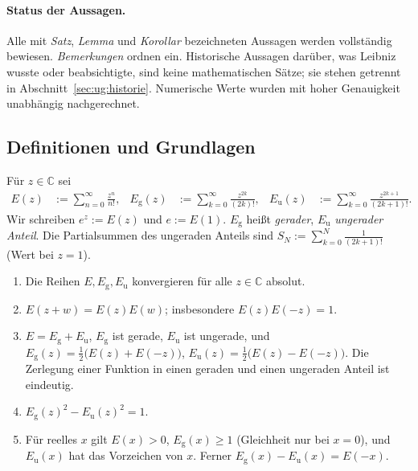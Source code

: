 \paragraph{Status der Aussagen.}
Alle mit \emph{Satz}, \emph{Lemma} und \emph{Korollar} bezeichneten Aussagen werden vollständig bewiesen. \emph{Bemerkungen} ordnen ein. Historische Aussagen darüber, was Leibniz wusste oder beabsichtigte, sind keine mathematischen Sätze; sie stehen getrennt in Abschnitt~\ref{sec:ug:historie}. Numerische Werte wurden mit hoher Genauigkeit unabhängig nachgerechnet.

\subsection{Definitionen und Grundlagen}
\label{sec:ug:grund}

\begin{definition}\label{def:ug:anteile}
Für $z\in\mathbb{C}$ sei
\begin{align}
E(z)&:=\sum_{n=0}^{\infty}\frac{z^n}{n!}, &
E_{\mathrm g}(z)&:=\sum_{k=0}^{\infty}\frac{z^{2k}}{(2k)!}, &
E_{\mathrm u}(z)&:=\sum_{k=0}^{\infty}\frac{z^{2k+1}}{(2k+1)!}.
\end{align}
Wir schreiben $e^z:=E(z)$ und $e:=E(1)$. $E_{\mathrm g}$ heißt \emph{gerader}, $E_{\mathrm u}$ \emph{ungerader Anteil}. Die Partialsummen des ungeraden Anteils sind $S_N:=\sum_{k=0}^{N}\frac{1}{(2k+1)!}$ (Wert bei $z=1$).
\end{definition}

\begin{lemma}[Grundeigenschaften]\label{lem:ug:grund}
\begin{enumerate}[label=(\alph*)]
\item Die Reihen $E,E_{\mathrm g},E_{\mathrm u}$ konvergieren für alle $z\in\mathbb{C}$ absolut.
\item $E(z+w)=E(z)E(w)$; insbesondere $E(z)E(-z)=1$.
\item $E=E_{\mathrm g}+E_{\mathrm u}$, $E_{\mathrm g}$ ist gerade, $E_{\mathrm u}$ ist ungerade, und
$E_{\mathrm g}(z)=\tfrac12\big(E(z)+E(-z)\big)$, $E_{\mathrm u}(z)=\tfrac12\big(E(z)-E(-z)\big)$.
Die Zerlegung einer Funktion in einen geraden und einen ungeraden Anteil ist eindeutig.
\item $E_{\mathrm g}(z)^2-E_{\mathrm u}(z)^2=1$.
\item Für reelles $x$ gilt $E(x)>0$, $E_{\mathrm g}(x)\ge 1$ (Gleichheit nur bei $x=0$), und $E_{\mathrm u}(x)$ hat das Vorzeichen von $x$. Ferner $E_{\mathrm g}(x)-E_{\mathrm u}(x)=E(-x)$.
\end{enumerate}
\end{lemma}

